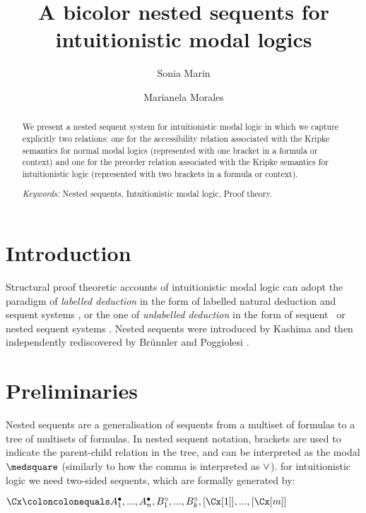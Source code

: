 \documentclass{easychair}
\title{A bicolor nested sequents for intuitionistic modal logics}
\author{
	Sonia Marin\inst{1}%
\and
    Marianela Morales\inst{2}%
}
\institute{
	University College London  \\
  \email{s.marin@ucl.ac.uk}
  \and
  LIX, \'Ecole Polytechnique  \&  Inria Saclay\\
	\email{marianela.morales@polytechnique.edu}
 }
\begin{document}
\maketitle

\begin{abstract}
We present a nested sequent system for intuitionistic modal logic in which we capture explicitly two relations: one for the accessibility relation associated with the Kripke semantics for normal modal logics (represented with one bracket in a formula or context) and one for the preorder relation associated with the Kripke semantics for intuitionistic logic (represented with two brackets in a formula or context).
%

\emph{Keywords:} Nested sequents, Intuitionistic modal logic, Proof theory. 
\end{abstract}

\section{Introduction}

Structural proof theoretic accounts of intuitionistic modal logic can adopt the paradigm of \emph{labelled deduction} in the form of labelled natural deduction and sequent systems \cite{simpson1994proof},
or the one of \emph{unlabelled deduction} in the form of sequent~\cite{bierman2000} or nested sequent systems \cite{strassburger2013cut}.
Nested sequents were introduced by Kashima \cite{kashima1994cut} and then independently rediscovered by Br\"{u}nnler \cite{brunnler2009deep} and Poggiolesi \cite{poggiolesi2009method}.

\section{Preliminaries}

Nested sequents are a generalisation of sequents from a multiset
of formulas to a tree of multisets of formulas.
In nested sequent notation, brackets are used to indicate the parent-child relation in the tree, and can be interpreted as the modal $\BOX$ (similarly to how the comma is interpreted as $\OR$). for intuitionistic logic we need two-sided sequents, which are formally generated by:
\begin{center}
	$\Cx \coloncolonequals \lf{A_{1}}, ..., \lf{A_{n}}, \rt{B_{1}},..., \rt{B_{k}}, \BR{\Cx[1]},..., \BR{\Cx[m]}$
\end{center}
\end{document}
